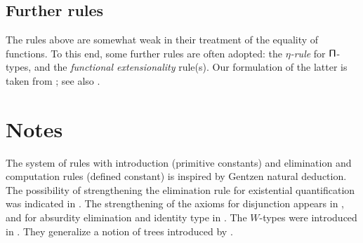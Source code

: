\subsection*{Further rules} \label{subsec:optional-rules}

The rules above are somewhat weak in their treatment of the equality of functions.  To this end, some further rules are often adopted: the \emph{$\eta$-rule} for $\mathsf{\Pi}$-types, and the \emph{functional extensionality} rule(s).  Our formulation of the latter is taken from \cite{garner:depprod}; see also \cite{hofmann:thesis}.


\egroup

\section*{Notes}\label{subsec:general-remarks}


  The system of rules with introduction (primitive constants) and elimination
  and computation rules (defined constant) is inspired by Gentzen natural
  deduction. The possibility of strengthening the elimination rule for
  existential quantification was indicated in \cite{Howard-1969}. The
  strengthening of the axioms for disjunction appears in \cite{Martin-Lof-1972},
  and for absurdity elimination and identity type in \cite{Martin-Lof-1973}. The
  $W$-types were introduced in \cite{Martin-Lof-1979}. They generalize a notion
  of trees introduced by \cite{Tait-1968}.

